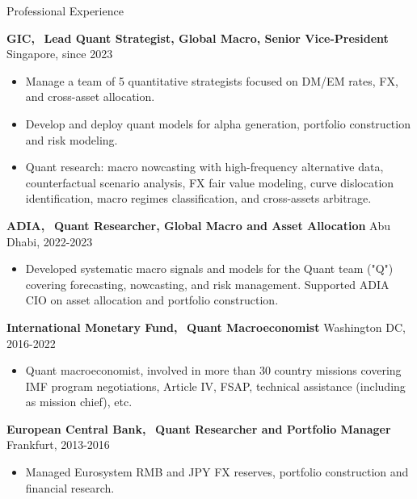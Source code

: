 \documentclass[usegeometry, 10pt, a4paper]{cv} %
\newcommand{\activite}[1]{\textbf{#1}\ }
\begin{document}
\begin{rubriquetableau}[0.95\textwidth]{Professional Experience}\\
\vspace{-0.5cm}

\activite{GIC,} \textbf{Lead Quant Strategist, Global Macro, Senior Vice-President} \hfill
Singapore, since 2023 \\ \vspace{-0.4cm}
\begin{itemize}
  \item Manage a team of 5 quantitative strategists focused on DM/EM rates, FX, and cross-asset allocation.
  \item Develop and deploy quant models for alpha generation, portfolio construction and risk modeling.
  \item Quant research: macro nowcasting with high-frequency alternative data, counterfactual scenario analysis, FX fair value modeling, curve dislocation identification, macro regimes classification, and cross-assets arbitrage.
\end{itemize} 
\vspace{0.2cm}

\activite{ADIA,} \textbf{Quant Researcher, Global Macro and Asset Allocation}  \hfill
Abu Dhabi, 2022-2023 \\ \vspace{-0.2cm}
\begin{itemize}[]
\item Developed systematic macro signals and models for the Quant team ("Q") covering forecasting, nowcasting, and risk management. Supported ADIA CIO on asset allocation and portfolio construction.
 \end{itemize}
 
\vspace{0.2cm}

\activite{International Monetary Fund,} \textbf{Quant Macroeconomist} \hfill Washington DC, 2016-2022 \\
\vspace{-0.2cm}

\begin{itemize}[]
  \item Quant macroeconomist, involved in more than 30 country missions covering IMF program negotiations, Article IV, FSAP, technical assistance (including as mission chief), etc.
  \end{itemize}
 
\vspace{0.2cm}

\activite{European Central Bank,} \textbf{Quant Researcher and Portfolio Manager} \hfill Frankfurt, 2013-2016 \\
\vspace{-0.2cm}

\begin{itemize}[]
  \item Managed Eurosystem RMB and JPY FX reserves, portfolio construction and financial research.
\end{itemize}
\end{rubriquetableau}
\end{document}
